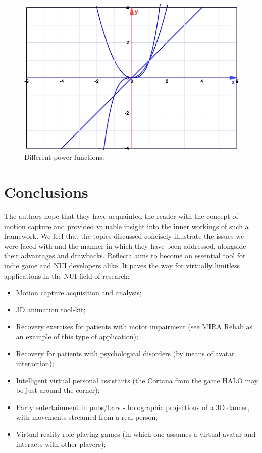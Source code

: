\documentclass[a4paper, 12pt]{amsart}
\begin{document}
\begin{figure}[htb]
\centering
\includegraphics[width=.9\linewidth]{fig_power_function}
\caption{Different power functions.}
\label{fig:power_function}
\end{figure}

\clearpage

\section{Conclusions}

The authors hope that they have acquainted the reader with the concept of motion capture and provided valuable insight into the inner workings of such a framework. We feel that the topics discussed concisely illustrate the issues we were faced with and the manner in which they have been addressed, alongside their advantages and drawbacks. Reflecta aims to become an essential tool for indie game and NUI developers alike. It paves the way for virtually limitless applications in the NUI field of research:

\begin{itemize}
\item Motion capture acquisition and analysis;
\item 3D animation tool-kit;
\item Recovery exercises for patients with motor impairment (see MIRA Rehab \cite{bib_mira} as an example of this type of application);
\item Recovery for patients with psychological disorders (by means of avatar interaction);
\item Intelligent virtual personal assistants (the Cortana from the game HALO may be just around the corner);
\item Party entertainment in pubs/bars - holographic projections of a 3D dancer, with movements streamed from a real person;
\item Virtual reality role playing games (in which one assumes a virtual avatar and interacts with other players);
\end{itemize}
\end{document}
